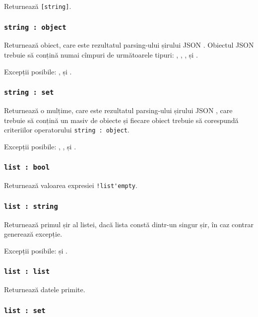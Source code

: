 Returnează \lstinline|[string]|.

\subsubsection{\lstinline|string : object|}

Returnează obiect, care este rezultatul parsing-ului șirului JSON \str. Obiectul JSON trebuie să conțină numai cîmpuri de următoarele tipuri: \bool, \integer, \double, \str{} și \listtype.

Excepții posibile: ,  și .

\subsubsection{\lstinline|string : set|}

Returnează o mulțime, care este rezultatul parsing-ului șirului JSON \str, care trebuie să conțină un masiv de obiecte și fiecare obiect trebuie să corespundă criteriilor operatorului \lstinline|string : object|.

Excepții posibile: , ,  și .

\subsubsection{\lstinline|list : bool|}

Returnează valoarea expresiei \lstinline|!list'empty|.

\subsubsection{\lstinline|list : string|}

Returnează primul șir al listei, dacă lista constă dintr-un singur șir, în caz contrar generează excepție.

Excepții posibile:  și .

\subsubsection{\lstinline|list : list|}

Returnează datele primite.

\subsubsection{\lstinline|list : set|}

